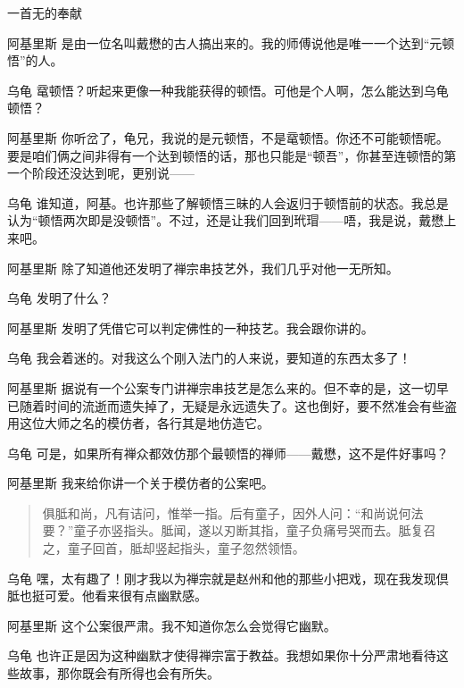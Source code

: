 \begin{dialog}{一首无的奉献\label{abcd}}
\begin{dialogue}
\item[阿基里斯]是由一位名叫戴懋的古人搞出来的。我的师傅说他是唯一一个达到“元顿悟”的人。

\item[乌龟]鼋顿悟？听起来更像一种我能获得的顿悟。可他是个人啊，怎么能达到乌龟顿悟？

\item[阿基里斯]你听岔了，龟兄，我说的是元顿悟，不是鼋顿悟。你还不可能顿悟呢。要是咱们俩之间非得有一个达到顿悟的话，那也只能是“顿吾”，你甚至连顿悟的第一个阶段还没达到呢，更别说——

\item[乌龟]谁知道，阿基。也许那些了解顿悟三昧的人会返归于顿悟前的状态。我总是认为“顿悟两次即是没顿悟”。不过，还是让我们回到玳瑁——唔，我是说，戴懋上来吧。

\item[阿基里斯]除了知道他还发明了禅宗串技艺外，我们几乎对他一无所知。

\item[乌龟]发明了什么？

\item[阿基里斯]发明了凭借它可以判定佛性的一种技艺。我会跟你讲的。

\item[乌龟]我会着迷的。对我这么个刚入法门的人来说，要知道的东西太多了！

\item[阿基里斯]据说有一个公案专门讲禅宗串技艺是怎么来的。但不幸的是，这一切早已随着时间的流逝而遗失掉了，无疑是永远遗失了。这也倒好，要不然准会有些盗用这位大师之名的模仿者，各行其是地仿造它。

\item[乌龟]可是，如果所有禅众都效仿那个最顿悟的禅师——戴懋，这不是件好事吗？

\item[阿基里斯]我来给你讲一个关于模仿者的公案吧。
\begin{quote}
俱胝和尚，凡有诘问，惟举一指。后有童子，因外人问：“和尚说何法要？”童子亦竖指头。胝闻，遂以刃断其指，童子负痛号哭而去。胝复召之，童子回首，胝却竖起指头，童子忽然领悟。
\end{quote}

\item[乌龟]嘿，太有趣了！刚才我以为禅宗就是赵州和他的那些小把戏，现在我发现倶胝也挺可爱。他看来很有点幽默感。

\item[阿基里斯]这个公案很严肃。我不知道你怎么会觉得它幽默。

\item[乌龟]也许正是因为这种幽默才使得禅宗富于教益。我想如果你十分严肃地看待这些故事，那你既会有所得也会有所失。


\end{dialogue}
\end{dialog}
